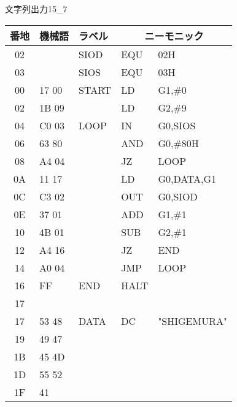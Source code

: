 \begin{reidai}{文字列出力1}{5_7}
  {\ttfamily\footnotesize\begin{center}
    \begin{tabular}{|c|l|l|l l|} \hline
      番地 & 機械語 & ラベル & \multicolumn{2}{|c|}{ニーモニック} \\
      \hline
      02 &        & SIOD   & EQU    & 02H            \\
      03 &        & SIOS   & EQU    & 03H            \\
      00 & 17 00  & START  & LD     & G1,\#0         \\
      02 & 1B 09  &        & LD     & G2,\#9         \\
      04 & C0 03  & LOOP   & IN     & G0,SIOS        \\
      06 & 63 80  &        & AND    & G0,\#80H       \\
      08 & A4 04  &        & JZ     & LOOP           \\
      0A & 11 17  &        & LD     & G0,DATA,G1     \\
      0C & C3 02  &        & OUT    & G0,SIOD        \\
      0E & 37 01  &        & ADD    & G1,\#1         \\
      10 & 4B 01  &        & SUB    & G2,\#1         \\
      12 & A4 16  &        & JZ     & END            \\
      14 & A0 04  &        & JMP    & LOOP           \\
      16 & FF     & END    & HALT   &                \\
      17 &        &        &        &                \\
      17 & 53 48  & DATA   & DC     & "SHIGEMURA"    \\
      19 & 49 47  &        &        &                \\
      1B & 45 4D  &        &        &                \\
      1D & 55 52  &        &        &                \\
      1F & 41     &        &        &                \\
      \hline
    \end{tabular}
  \end{center}}
\end{reidai}

